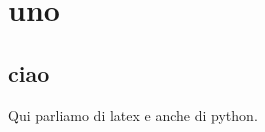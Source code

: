 \documentclass{report}
\begin{document}
	

	\chapter{uno}
	\newpage
	\section{ciao}
	Qui parliamo di \gls{latex} e anche di \gls{python}.

	\printunsrtglossary[type=main]
\end{document}
